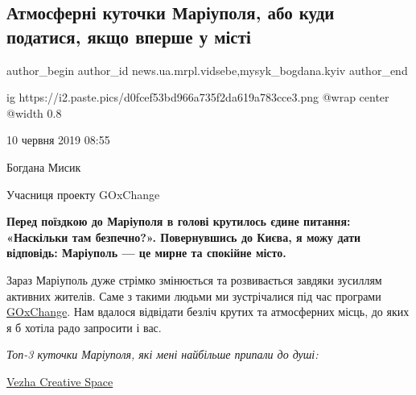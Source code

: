  
 
 
 
 
 
\subsection{Атмосферні куточки Маріуполя, або куди податися, якщо вперше у місті}
\label{sec:10_06_2019.stz.news.ua.mrpl.vidsebe.1.atmosferni_kutochky_mariupolja}
 
\ifcmt
 author_begin
   author_id news.ua.mrpl.vidsebe,mysyk_bogdana.kyiv
 author_end
\fi

\ifcmt
  ig https://i2.paste.pics/d0fcef53bd966a735f2da619a783cce3.png
  @wrap center
  @width 0.8
\fi


10 червня 2019 08:55

Богдана Мисик

Учасниця проекту GOxChange

\textbf{Перед поїздкою до Маріуполя в голові крутилось єдине питання: «Наскільки там
безпечно?». Повернувшись до Києва, я можу дати відповідь: Маріуполь — це мирне
та спокійне місто.}

Зараз Маріуполь дуже стрімко змінюється та розвивається завдяки зусиллям
активних жителів. Саме з такими людьми ми зустрічалися під час програми
\href{https://vidsebe.media/read/ljudy/33574/mi-rizni-ale-ridni-yak-molod-zi-vsiei-ukraini-doslidzhuvala-mariupol-ta-borolasya-zi-stereotipami}{GOxChange}. Нам вдалося відвідати безліч крутих та атмосферних місць, до яких я
б хотіла радо запросити і вас.

\begin{center}
\Large\em Топ-3 куточки Маріуполя, які мені найбільше припали до душі: 
\end{center}

\begin{center}
{\Large\href{https://www.facebook.com/vezhacreativespace}{Vezha Creative Space}}
\end{center}

